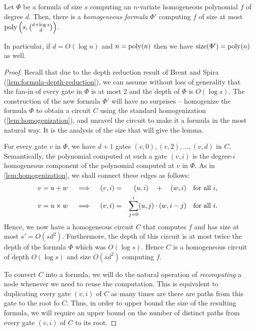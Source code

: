 \begin{lemma}\label{lem:formula-homogenization} Let $\Phi$ be a formula of size $s$ computing an $n$-variate homogeneous polynomial $f$ of degree $d$. Then, there is a \emph{homogeneous formula} $\Phi'$ computing $f$ of size at most $\operatorname{poly}\left(s,\binom{d+\log s}{d}\right)$. 

In particular, if $d = O(\log n)$ and $n = \operatorname{poly}(n)$ then we have $\mathrm{size}(\Phi') = \operatorname{poly}(n)$ as well. 
\end{lemma}
\begin{proof}
Recall that due to the depth reduction result of Brent and Spira (\autoref{lem:formula-depth-reduction}), we can assume
without loss of generality that the fan-in of every gate in $\Phi$ is at most $2$ and the depth of $\Phi$ is $O(\log s)$.
The construction of the new formula $\Phi'$ will have no surprises -- homogenize the formula $\Phi$ to obtain a circuit $C$ using the standard homogenization (\autoref{lem:homogenization}), and unravel the circuit to make it a formula in the most natural way. It is the analysis of the size that will give the lemma.

\medskip

For every gate $v$ in $\Phi$, we have $d+1$ gates $(v, 0), (v, 2), \ldots, (v, d)$ in $C$.
Semantically, the polynomial computed at such a gate $(v, i)$ is the degree-$i$ homogeneous component of the polynomial computed at $v$ in $\Phi$. As in \autoref{lem:homogenization}, we shall connect these edges as follows:
\begin{eqnarray*}
v = u+w\quad\implies\quad (v, i) &=& (u, i) \quad + \quad (w,i)\quad\text{for all $i$,}\\
v = u\times w\quad\implies\quad (v, i) &=& \sum_{j=0}^i (u,j)\cdot (w, {i-j}) \quad\text{for all $i$.}
\end{eqnarray*}
Hence, we now have a homogeneous circuit $C$ that computes $f$ and has size at most $s' = O(sd^2)$. Furthermore, the depth of this circuit is at most twice the depth of the formula $\Phi$ which was $O(\log s)$. Hence $C$ is a homogeneous circuit of depth $O(\log s)$ and size $O(sd^2)$ computing $f$. 

To convert $C$ into a formula, we will do the natural operation of \emph{recomputing} a node whenever we need to reuse the computation. This is equivalent to duplicating every gate $(v,i)$ of $C$ as many times are there are paths from this gate to the root fo $C$.
Thus, in order to upper bound the size of the resulting formula, we will require an upper bound on the number of distinct paths from every gate $(v,i)$ of $C$ to its root.


\end{proof}

